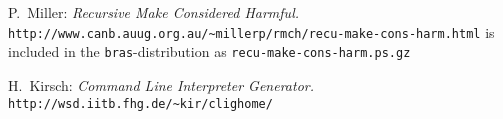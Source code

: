 \documentclass[11pt]{scrartcl}
\newcommand{\bras}{\texttt{bras}}
\begin{document}
\begin{thebibliography}{9}

P.~Miller:
\textit{Recursive Make Considered Harmful.} 
\texttt{http://www.canb\hspace{0pt}.auug\hspace{0pt}.org.au/\~{}millerp/rmch/recu-make-cons-harm.html} 
is included in the \bras-distribution as
\texttt{recu-make-cons-harm.ps.gz}

H.~Kirsch:
\textit{Command Line Interpreter Generator.}
\texttt{http://wsd.ii\-tb\hspace{0pt}.fhg.de/\~{}kir/clighome/}

\end{thebibliography}
\end{document}
